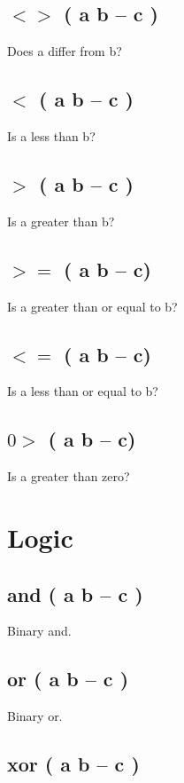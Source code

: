 \subsection{$<>$ ( a b -- c )}

Does a differ from b?

\subsection{$<$ ( a b -- c )}

Is a less than b?

\subsection{$>$ ( a b -- c )}

Is a greater than b?

\subsection{$>=$ ( a b -- c)}

Is a greater than or equal to b?

\subsection{$<=$ ( a b -- c)}

Is a less than or equal to b?

\subsection{$0>$ ( a b -- c)}

Is a greater than zero?


\section{Logic}

\subsection{and ( a b -- c )}

Binary and.

\subsection{or ( a b -- c )}

Binary or.

\subsection{xor ( a b -- c )}

